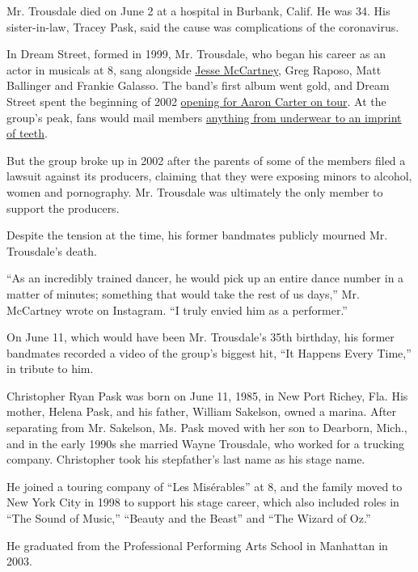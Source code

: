 Mr. Trousdale died on June 2 at a hospital in Burbank, Calif. He was 34.
His sister-in-law, Tracey Pask, said the cause was complications of the
coronavirus.

In Dream Street, formed in 1999, Mr. Trousdale, who began his career as
an actor in musicals at 8, sang alongside
\href{https://www.nytimes.com/2009/03/22/fashion/22night.html?searchResultPosition=1}{Jesse
McCartney}, Greg Raposo, Matt Ballinger and Frankie Galasso. The band's
first album went gold, and Dream Street spent the beginning of 2002
\href{https://idobi.com/news/dream-street-hits-the-road-with-aaron-carter-in-2002/}{opening
for Aaron Carter on tour}. At the group's peak, fans would mail members
\href{https://www.nytimes.com/2002/12/08/magazine/the-way-we-live-now-12-8-02-kids-after-they-were-stars.html}{anything
from underwear to an imprint of teeth}.

But the group broke up in 2002 after the parents of some of the members
filed a lawsuit against its producers, claiming that they were exposing
minors to alcohol, women and pornography. Mr. Trousdale was ultimately
the only member to support the producers.

Despite the tension at the time, his former bandmates publicly mourned
Mr. Trousdale's death.

``As an incredibly trained dancer, he would pick up an entire dance
number in a matter of minutes; something that would take the rest of us
days,'' Mr. McCartney wrote on Instagram. ``I truly envied him as a
performer.''

On June 11, which would have been Mr. Trousdale's 35th birthday, his
former bandmates recorded a video of the group's biggest hit, ``It
Happens Every Time,'' in tribute to him.

Christopher Ryan Pask was born on June 11, 1985, in New Port Richey,
Fla. His mother, Helena Pask, and his father, William Sakelson, owned a
marina. After separating from Mr. Sakelson, Ms. Pask moved with her son
to Dearborn, Mich., and in the early 1990s she married Wayne Trousdale,
who worked for a trucking company. Christopher took his stepfather's
last name as his stage name.

He joined a touring company of ``Les Misérables'' at 8, and the family
moved to New York City in 1998 to support his stage career, which also
included roles in ``The Sound of Music,'' ``Beauty and the Beast'' and
``The Wizard of Oz.''

He graduated from the Professional Performing Arts School in Manhattan
in 2003.

